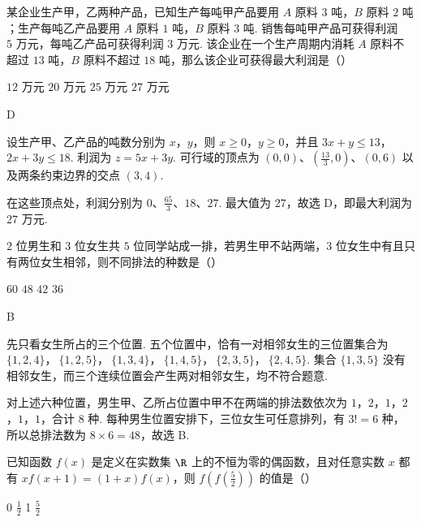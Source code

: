 \begin{problem}
某企业生产甲，乙两种产品，已知生产每吨甲产品要用 \(A\) 原料 \(3\text{ 吨}\)，\(B\) 原料 \(2\text{ 吨}\)；生产每吨乙产品要用 \(A\) 原料 \(1\text{ 吨}\)，\(B\) 原料 \(3\text{ 吨}\). 销售每吨甲产品可获得利润 \(5\text{ 万元}\)，每吨乙产品可获得利润 \(3\text{ 万元}\). 该企业在一个生产周期内消耗 \(A\) 原料不超过 \(13\text{ 吨}\)，\(B\) 原料不超过 \(18\text{ 吨}\)，那么该企业可获得最大利润是（\quad）

\choices
    {\(12\text{ 万元}\)}
    {\(20\text{ 万元}\)}
    {\(25\text{ 万元}\)}
    {\(27\text{ 万元}\)}
\end{problem}

\begin{answer}
D
\end{answer}

\begin{solution}
设生产甲、乙产品的吨数分别为 \(x\)，\(y\)，则 \(x\ge0\)，\(y\ge0\)，并且
\(3x+y\le13\)，\(2x+3y\le18\).
利润为 \(z=5x+3y\). 可行域的顶点为
\((0,0)\)、\(\left(\frac{13}{3},0\right)\)、\((0,6)\) 以及两条约束边界的交点
\((3,4)\).

在这些顶点处，利润分别为 \(0\)、\(\frac{65}{3}\)、\(18\)、\(27\). 最大值为 \(27\)，故选 D，即最大利润为 \(27\text{ 万元}\).
\end{solution}

\begin{problem}
\(2\) 位男生和 \(3\) 位女生共 \(5\) 位同学站成一排，若男生甲不站两端，\(3\) 位女生中有且只有两位女生相邻，则不同排法的种数是（\quad）

\choices
    {\(60\)}
    {\(48\)}
    {\(42\)}
    {\(36\)}
\end{problem}

\begin{answer}
B
\end{answer}

\begin{solution}
先只看女生所占的三个位置. 五个位置中，恰有一对相邻女生的三位置集合为
\(\{1,2,4\}\)，\(\ \{1,2,5\}\)，\(\ \{1,3,4\}\)，\(\ \{1,4,5\}\)，\(\ \{2,3,5\}\)，\(\ \{2,4,5\}\).
集合 \(\{1,3,5\}\) 没有相邻女生，而三个连续位置会产生两对相邻女生，均不符合题意.

对上述六种位置，男生甲、乙所占位置中甲不在两端的排法数依次为
\(1\)，\(2\)，\(1\)，\(2\)，\(1\)，\(1\)，合计 \(8\) 种. 每种男生位置安排下，三位女生可任意排列，有
\(3!=6\) 种，所以总排法数为 \(8\times6=48\)，故选 B.
\end{solution}

\begin{problem}
已知函数 \(f(x)\) 是定义在实数集 \(\R\) 上的不恒为零的偶函数，且对任意实数 \(x\) 都有 \(x f(x + 1) = (1 + x)f(x)\)，则 \(f\left(f\left(\frac{5}{2}\right)\right)\) 的值是（\quad）

\choices
    {0}
    {\(\frac{1}{2}\)}
    {1}
    {\(\frac{5}{2}\)}
\end{problem}


